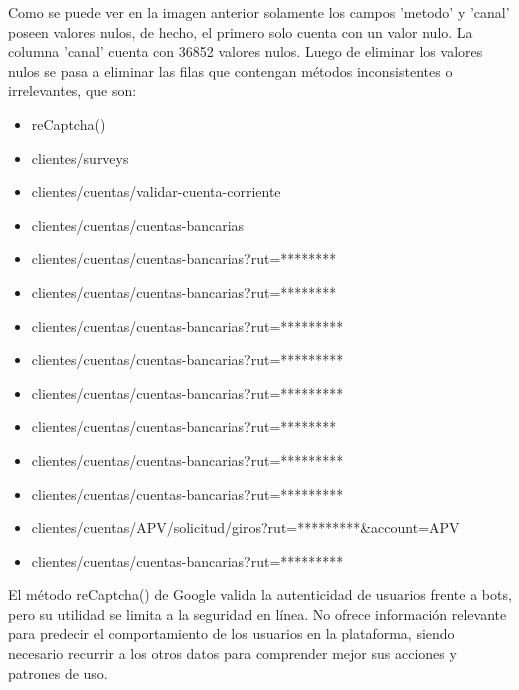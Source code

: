 Como se puede ver en la imagen anterior solamente los campos 'metodo' y 'canal' poseen valores nulos, de hecho, el primero solo cuenta con un valor nulo. La columna 'canal' cuenta con 36852 valores nulos. Luego de eliminar los valores nulos se pasa a eliminar las filas que contengan métodos inconsistentes o irrelevantes, que son:
\begin{itemize}
    \item reCaptcha()
    \item clientes/surveys
    \item clientes/cuentas/validar-cuenta-corriente
    \item clientes/cuentas/cuentas-bancarias
    \item clientes/cuentas/cuentas-bancarias?rut=******** 
    \item clientes/cuentas/cuentas-bancarias?rut=********
    \item clientes/cuentas/cuentas-bancarias?rut=*********
    \item clientes/cuentas/cuentas-bancarias?rut=*********
    \item clientes/cuentas/cuentas-bancarias?rut=*********
    \item clientes/cuentas/cuentas-bancarias?rut=********
    \item clientes/cuentas/cuentas-bancarias?rut=*********
    \item clientes/cuentas/cuentas-bancarias?rut=*********
    \item clientes/cuentas/APV/solicitud/giros?rut=*********\&account=APV
    \item clientes/cuentas/cuentas-bancarias?rut=*********
\end{itemize}

El método reCaptcha() de Google valida la autenticidad de usuarios frente a bots, pero su utilidad se limita a la seguridad en línea. No ofrece información relevante para predecir el comportamiento de los usuarios en la plataforma, siendo necesario recurrir a los otros datos para comprender mejor sus acciones y patrones de uso.
